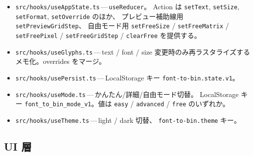\begin{itemize}[leftmargin=*,itemsep=2pt]
  \item \texttt{src/hooks/useAppState.ts}\,---\,\texttt{useReducer}。
        Action は \texttt{setText}, \texttt{setSize},
        \texttt{setFormat}, \texttt{setOverride} のほか、
        プレビュー補助線用 \texttt{setPreviewGridStep}、
        自由モード用 \texttt{setFreeSize} / \texttt{setFreeMatrix} /
        \texttt{setFreePixel} / \texttt{setFreeGridStep} /
        \texttt{clearFree} を提供する。
  \item \texttt{src/hooks/useGlyphs.ts}\,---\,text / font / size
        変更時のみ再ラスタライズするメモ化。overrides をマージ。
  \item \texttt{src/hooks/usePersist.ts}\,---\,LocalStorage キー
        \texttt{font-to-bin.state.v1}。
  \item \texttt{src/hooks/useMode.ts}\,---\,かんたん/詳細/自由モード切替。
        LocalStorage キー \texttt{font\_to\_bin\_mode\_v1}。値は
        \texttt{easy} / \texttt{advanced} / \texttt{free} のいずれか。
  \item \texttt{src/hooks/useTheme.ts}\,---\,light / dark 切替、
        \texttt{font-to-bin.theme} キー。
\end{itemize}

\subsection{UI 層}


